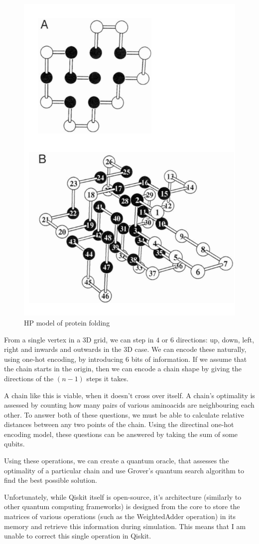 \begin{figure}[H]
    \centering
    \includegraphics[width=0.5\linewidth]{content/assets/02_introduction/hp_model.png}
    \caption{HP model of protein folding\cite{dill_principles_2008}}
\end{figure}

From a single vertex in a 3D grid, we can step in $4$ or $6$ directions: up, down, left, right and inwards and outwards in the 3D case. We can encode these naturally, using one-hot encoding, by introducing $6$ bits of information. If we assume that the chain starts in the origin, then we can encode a chain shape by giving the directions of the $(n-1)$ steps it takes.

A chain like this is viable, when it doesn't cross over itself. A chain's optimality is assessed by counting how many pairs of various aminoacids are neighbouring each other. To answer both of these questions, we must be able to calculate relative distances between any two points of the chain. Using the directinal one-hot encoding model, these questions can be answered by taking the sum of some qubits.

Using these operations, we can create a quantum oracle, that assesses the optimality of a particular chain and use Grover's quantum search algorithm to find the best possible solution.

Unfortunately, while Qiskit itself is open-source, it's architecture (similarly to other quantum computing frameworks) is designed from the core to store the matrices of various operations (such as the WeightedAdder operation) in its memory and retrieve this information during simulation. This means that I am unable to correct this single operation in Qiskit.

